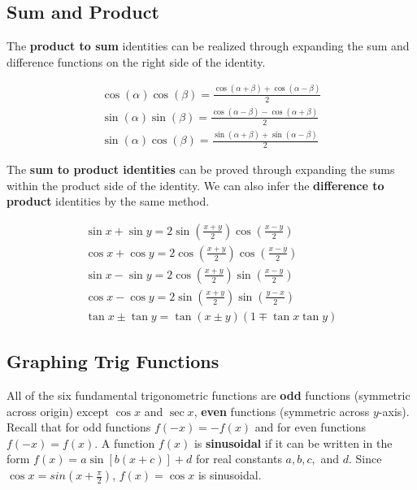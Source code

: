 \documentclass{article}
\begin{document}
        \subsection{Sum and Product}
            \noindent The \color{purple} \textbf{product to sum} \color{black} identities can be
            realized through expanding the sum and difference functions on\textbf{} the right side
            of the identity.

            \begin{align*}
                \cos(\alpha)\cos(\beta)=\frac{\cos(\alpha+\beta)+\cos(\alpha-\beta)}{2} \\
                \sin(\alpha)\sin(\beta)=\frac{\cos(\alpha-\beta)-\cos(\alpha+\beta)}{2} \\
                \sin(\alpha)\cos(\beta)=\frac{\sin(\alpha+\beta)+\sin(\alpha-\beta)}{2}
            \end{align*}

            \noindent The \color{purple} \textbf{sum to product identities} \color{black} can be
            proved through expanding the sums within the product side of the identity. We can also
            infer the \color{purple} \textbf{difference to product} \color{black} identities by the
            same method.

            \begin{align*}
                \sin x + \sin y = 2\sin(\frac{x+y}{2})\cos(\frac{x-y}{2}) \\
                \cos x + \cos y = 2\cos(\frac{x+y}{2})\cos(\frac{x-y}{2}) \\
                \sin x - \sin y = 2 \cos (\frac{x+y}{2}) \sin(\frac{x-y}{2}) \\
                \cos x - \cos y = 2 \sin (\frac{x+y}{2}) \sin(\frac{y-x}{2}) \\
                \tan x \pm \tan y = \tan(x\pm y)(1\mp \tan x \tan y)
            \end{align*}


        \pagebreak
        \subsection{Graphing Trig Functions}
            All of the six fundamental trigonometric functions are \textbf{odd} functions
            (symmetric across origin) except $\cos x$ and $\sec x$, \textbf{even} functions
            (symmetric across $y$-axis). Recall that for odd functions $f(-x)=-f(x)$ and for even
            functions $f(-x)=f(x)$. A function $f(x)$ is \textbf{sinusoidal} if it can be written in
            the form $f(x)=a\sin[b(x+c)]+d$ for real constants $a, b, c,$ and $d$. Since
            $\cos x = sin (x+\frac{\pi}{2})$, $f(x)=\cos x$ is sinusoidal. \\
\end{document}
